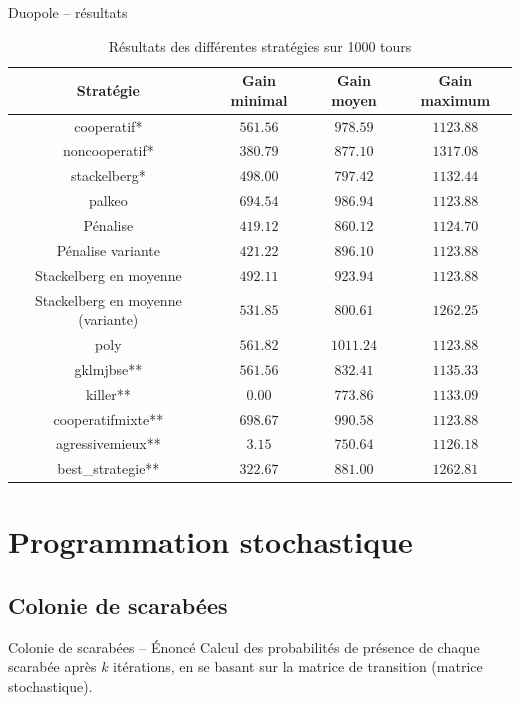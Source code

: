 \documentclass{beamer}
\begin{document}
\begin{frame}{Duopole -- résultats}
  \tiny{%
    \begin{table}[f]
      \centering
      \begin{tabular}{|c||c|c|c|}
        \hline
        Stratégie      & Gain minimal & Gain moyen & Gain maximum \\\hline\hline
         cooperatif* & $561.56$ & $978.59$ & $1123.88$ \\\hline
      noncooperatif* & $380.79$ & $877.10$ & $1317.08$ \\\hline
        stackelberg* & $498.00$ & $797.42$ & $1132.44$ \\\hline
              palkeo & $694.54$ & $986.94$ & $1123.88$ \\\hline
            Pénalise & $419.12$ & $860.12$ & $1124.70$ \\\hline
   Pénalise variante & $421.22$ & $896.10$ & $1123.88$ \\\hline
Stackelberg en moyenne & $492.11$ & $923.94$ & $1123.88$ \\\hline
Stackelberg en moyenne (variante) & $531.85$ & $800.61$ & $1262.25$ \\\hline
                poly & $561.82$ & $1011.24$ & $1123.88$ \\\hline
          gklmjbse** & $561.56$ & $832.41$ & $1135.33$ \\\hline
            killer** & $  0.00$ & $773.86$ & $1133.09$ \\\hline
   cooperatifmixte** & $698.67$ & $990.58$ & $1123.88$ \\\hline
    agressivemieux** & $  3.15$ & $750.64$ & $1126.18$ \\\hline
   best\_strategie** & $322.67$ & $881.00$ & $1262.81$ \\\hline
      \end{tabular}
      \caption{Résultats des différentes stratégies sur 1000 tours}
      \label{table:coop_results2}
    \end{table}
  }
\end{frame}

\section{Programmation stochastique}
\subsection{Colonie de scarabées}
  \begin{frame}{Colonie de scarabées -- Énoncé}
    Calcul des probabilités de présence de chaque scarabée après $k$ itérations,
    en se basant sur la matrice de transition (matrice stochastique).
  \end{frame}
\end{document}

